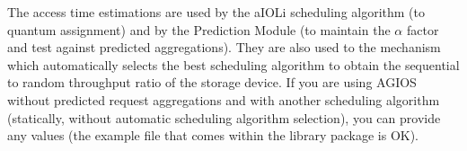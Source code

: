 The access time estimations are used by the aIOLi scheduling algorithm (to quantum assignment) and by the Prediction Module (to maintain the $\alpha$ factor and test against predicted aggregations). They are also used to the mechanism which automatically selects the best scheduling algorithm to obtain the sequential to random throughput ratio of the storage device. If you are using AGIOS without predicted request aggregations and with another scheduling algorithm (statically, without automatic scheduling algorithm selection), you can provide any values (the example file that comes within the library package is OK).

